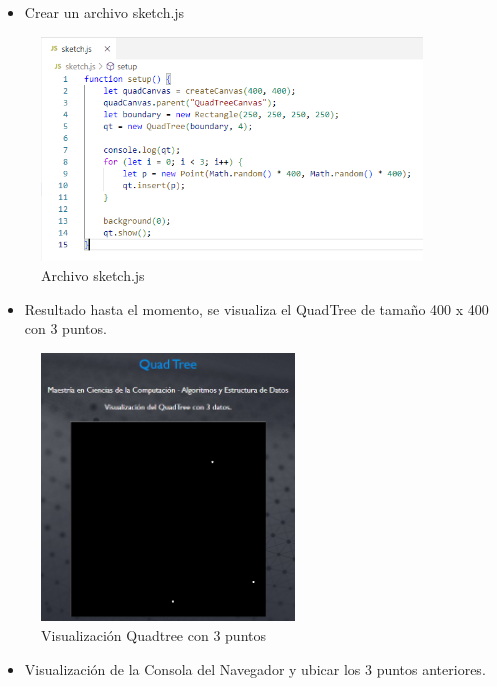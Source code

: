 \documentclass{article}
\begin{document}
\begin{enumerate}
\begin{itemize}
   \item Crear un archivo sketch.js
\end{itemize}

\begin{figure}[H]
\centering
\includegraphics[width=0.9\textwidth]{Img/sketch.png}
\caption{Archivo sketch.js}
\end{figure}

\begin{itemize}
   \item Resultado hasta el momento, se visualiza el QuadTree de tamaño 400 x 400 con 3 puntos.
\end{itemize}

\begin{figure}[H]
\centering
\includegraphics[width=0.6\textwidth]{Img/tres puntos_quadtree.png}
\caption{Visualización Quadtree con 3 puntos}
\end{figure}

\begin{itemize}
   \item Visualización de la Consola del Navegador y ubicar los 3 puntos anteriores.
\end{itemize}


\end{enumerate}
\end{document}
